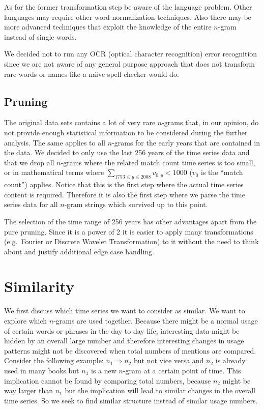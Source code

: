 As for the former transformation step be aware of the language problem. Other languages may require other word normalization techniques. Also there may be more advanced techniques that exploit the knowledge of the entire $n$-gram instead of single words.

We decided not to run any OCR (optical character recognition) error recognition since we are not aware of any general purpose approach that does not transform rare words or names like a na\"{\i}ve spell checker would do.


\subsection{Pruning}
\label{ssec:baseline:data:prune}
The original data sets contains a lot of very rare $n$-grams that, in our opinion, do not provide enough statistical information to be considered during the further analysis. The same applies to all $n$-grams for the early years that are contained in the data. We decided to only use the last \num{256} years of the time series data and that we drop all $n$-grams where the related match count time series is too small, or in mathematical terms where $\sum_{1753 \leq y \leq 2008} v_{0, y} < 1000$ ($v_0$ is the \enquote{match count}) applies. Notice that this is the first step where the actual time series content is required. Therefore it is also the first step where we parse the time series data for all $n$-gram strings which survived up to this point.

The selection of the time range of \num{256} years has other advantages apart from the pure pruning. Since it is a power of \num{2} it is easier to apply many transformations (e.g.\ Fourier or Discrete Wavelet Transformation) to it without the need to think about and justify additional edge case handling.



\section{Similarity}
\label{sec:baseline:sim}
We first discuss which time series we want to consider as similar. We want to explore which $n$-grams are used together. Because there might be a normal usage of certain words or phrases in the day to day life, interesting data might be hidden by an overall large number and therefore interesting changes in usage patterns might not be discovered when total numbers of mentions are compared. Consider the following example: $n_1 \Rightarrow n_2$ but not vice versa and $n_2$ is already used in many books but $n_1$ is a new $n$-gram at a certain point of time. This implication cannot be found by comparing total numbers, because $n_2$ might be way larger than $n_1$ but the implication will lead to similar changes in the overall time series. So we seek to find similar structure instead of similar usage numbers.

